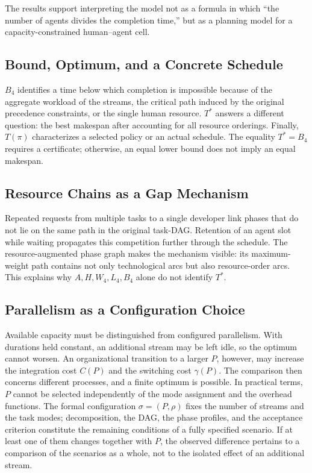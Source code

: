 The results support interpreting the model not as a formula in which ``the
number of agents divides the completion time,'' but as a planning model for a
capacity-constrained human--agent cell.

\subsection{Bound, Optimum, and a Concrete Schedule}

$B_4$ identifies a time below which completion is impossible because of the
aggregate workload of the streams, the critical path induced by the original
precedence constraints, or the single human resource. $T^*$ answers a
different question: the best makespan after accounting for all resource
orderings. Finally, $T(\pi)$ characterizes a selected policy or an actual
schedule. The equality $T^*=B_4$ requires a certificate; otherwise, an equal
lower bound does not imply an equal makespan.

\subsection{Resource Chains as a Gap Mechanism}

Repeated requests from multiple tasks to a single developer link phases that
do not lie on the same path in the original task-DAG\@. Retention of an agent slot
while waiting propagates this competition further through the schedule. The
resource-augmented phase graph makes the mechanism visible: its maximum-weight
path contains not only technological arcs but also resource-order arcs. This
explains why $A,H,W_4,L_4,B_4$ alone do not identify $T^*$.

\subsection{Parallelism as a Configuration Choice}

Available capacity must be distinguished from configured parallelism. With
durations held constant, an additional stream may be left idle, so the optimum
cannot worsen. An organizational transition to a larger $P$, however, may
increase the integration cost $C(P)$ and the switching cost $\gamma(P)$. The
comparison then concerns different processes, and a finite optimum is possible.
In practical terms, $P$ cannot be selected independently of the mode assignment
and the overhead functions. The formal configuration $\sigma=(P,\rho)$ fixes
the number of streams and the task modes; decomposition, the DAG, the phase
profiles, and the acceptance criterion constitute the remaining conditions of
a fully specified scenario. If at least one of them changes together with $P$,
the observed difference pertains to a comparison of the scenarios as a whole,
not to the isolated effect of an additional stream.

